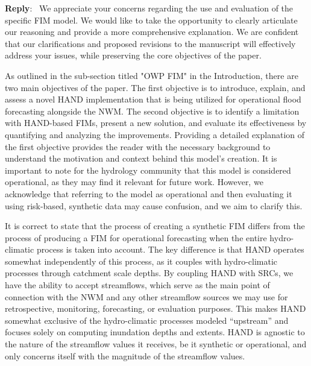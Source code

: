 \documentclass[11pt]{article}
\newcounter{reviewer}
\newcounter{point}[reviewer]
\newenvironment{reply}
   {\medskip \noindent \begin{sf}\textbf{Reply}:\  }
   {\medskip \end{sf}}
\begin{document}
\begin{reply}
We appreciate your concerns regarding the use and evaluation of the specific FIM model.
We would like to take the opportunity to clearly articulate our reasoning and provide a more comprehensive explanation. We are confident that our clarifications and proposed revisions to the manuscript will effectively address your issues, while preserving the core objectives of the paper.

As outlined in the sub-section titled "OWP FIM" in the Introduction, there are two main objectives of the paper.
The first objective is to introduce, explain, and assess a novel HAND implementation that is being utilized for operational flood forecasting alongside the NWM.
The second objective is to identify a limitation with HAND-based FIMs, present a new solution, and evaluate its effectiveness by quantifying and analyzing the improvements.
Providing a detailed explanation of the first objective provides the reader with the necessary background to understand the motivation and context behind this model's creation.
It is important to note for the hydrology community that this model is considered operational, as they may find it relevant for future work.
However, we acknowledge that referring to the model as operational and then evaluating it using risk-based, synthetic data may cause confusion, and we aim to clarify this.

It is correct to state that the process of creating a synthetic FIM differs from the process of producing a FIM for operational forecasting when the entire hydro-climatic process is taken into account.
The key difference is that HAND operates somewhat independently of this process, as it couples with hydro-climatic processes through catchment scale depths.
By coupling HAND with SRCs, we have the ability to accept streamflows, which serve as the main point of connection with the NWM and any other streamflow sources we may use for retrospective, monitoring, forecasting, or evaluation purposes.
This makes HAND somewhat exclusive of the hydro-climatic processes modeled ``upstream'' and focuses solely on computing inundation depths and extents.
HAND is agnostic to the nature of the streamflow values it receives, be it synthetic or operational, and only concerns itself with the magnitude of the streamflow values.


\end{reply}
\end{document}
